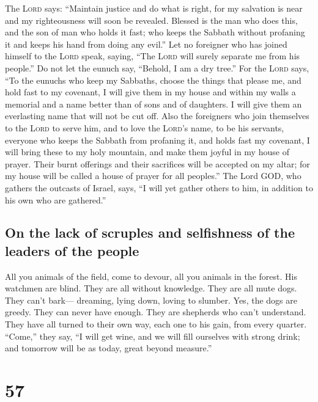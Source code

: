  The \textsc{Lord} says: ``Maintain justice and do what is
right, for my salvation is near and my righteousness will soon be
revealed.  Blessed is the man who does this, and the son
of man who holds it fast; who keeps the Sabbath without profaning it and
keeps his hand from doing any evil.''  Let no foreigner
who has joined himself to the \textsc{Lord} speak, saying, ``The
\textsc{Lord} will surely separate me from his people.'' Do not let the
eunuch say, ``Behold, I am a dry tree.''  For the
\textsc{Lord} says, ``To the eunuchs who keep my Sabbaths, choose the
things that please me, and hold fast to my covenant,  I
will give them in my house and within my walls a memorial and a name
better than of sons and of daughters. I will give them an everlasting
name that will not be cut off.  Also the foreigners who
join themselves to the \textsc{Lord} to serve him, and to love the
\textsc{Lord}'s name, to be his servants, everyone who keeps the Sabbath
from profaning it, and holds fast my covenant,  I will
bring these to my holy mountain, and make them joyful in my house of
prayer. Their burnt offerings and their sacrifices will be accepted on
my altar; for my house will be called a house of prayer for all
peoples.''  The Lord GOD, who gathers the outcasts of
Israel, says, ``I will yet gather others to him, in addition to his own
who are gathered.''

\hypertarget{on-the-lack-of-scruples-and-selfishness-of-the-leaders-of-the-people}{%
\subsection{On the lack of scruples and selfishness of the leaders of
the
people}\label{on-the-lack-of-scruples-and-selfishness-of-the-leaders-of-the-people}}

 All you animals of the field, come to devour, all you
animals in the forest.  His watchmen are blind. They are
all without knowledge. They are all mute dogs. They can't bark---
dreaming, lying down, loving to slumber.  Yes, the dogs
are greedy. They can never have enough. They are shepherds who can't
understand. They have all turned to their own way, each one to his gain,
from every quarter.  ``Come,'' they say, ``I will get
wine, and we will fill ourselves with strong drink; and tomorrow will be
as today, great beyond measure.''

\hypertarget{section-56}{%
\section{57}\label{section-56}}


